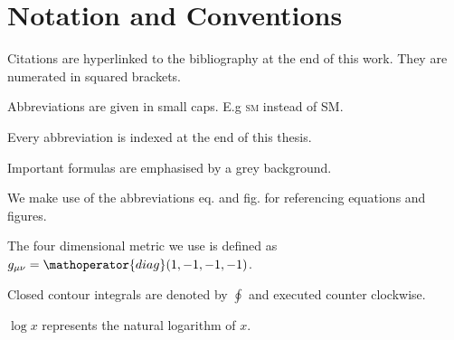 \documentclass[../../index.tex]{subfiles}
\begin{document}
\chapter*{Notation and Conventions}

Citations are hyperlinked to the bibliography at the end of this work. They are
numerated in squared brackets. \vspace{0.3cm}

Abbreviations are given in small caps. E.g \textsc{sm} instead of SM.
\vspace{0.3cm}

Every abbreviation is indexed at the end of this thesis. \vspace{0.3cm}

Important formulas are emphasised by a grey background. \vspace{0.3cm}

We make use of the abbreviations eq. and fig. for referencing equations and
figures. \vspace{0.3cm}

The four dimensional metric we use is defined as \(g_{\mu\nu} =
\mathoperator{diag}(1, -1, -1, -1)\). \vspace{0.3cm}

Closed contour integrals are denoted by \(\oint\) and executed
counter clockwise. \vspace{0.3cm}

\(\log x\) represents the natural logarithm of \(x\).
\end{document}

